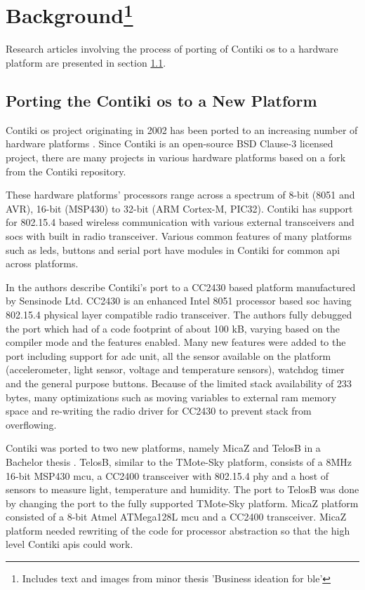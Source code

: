 \chapter[Background]{Background\footnote{Includes text and images from minor thesis 'Business ideation for \gls{ble}'}}

Research articles involving the process of porting of Contiki \gls{os} to a hardware platform are presented in section \ref{2Porting}.


\section{Porting the Contiki \gls{os} to a New Platform} \label{2Porting}
Contiki \gls{os} project originating in 2002 has been ported to an increasing number of hardware platforms \cite{contikiHw}. Since Contiki is an open-source BSD Clause-3 licensed project, there are many projects in various hardware platforms based on a fork from the Contiki repository.

These hardware platforms' processors range across a spectrum of 8-bit (8051 and AVR), 16-bit (MSP430) to 32-bit (ARM Cortex-M, PIC32). Contiki has support for 802.15.4 based wireless communication with various external transceivers and \glspl{soc} with built in radio transceiver. Various common features of many platforms such as \glspl{led}, buttons and serial port have modules in Contiki for common \gls{api} across platforms.

In \cite{Oikonomou2011} the authors describe Contiki's port to a CC2430 based platform manufactured by Sensinode Ltd. CC2430 is an enhanced Intel 8051 processor based \gls{soc} having 802.15.4 physical layer compatible radio transceiver. The authors fully debugged the port which had of a code footprint of about 100 kB, varying based on the compiler mode and the features enabled. Many new features were added to the port including support for \gls{adc} unit, all the sensor available on the platform (accelerometer, light sensor, voltage and temperature sensors), watchdog timer and the general purpose buttons. Because of the limited stack availability of 233 bytes, many optimizations such as moving variables to external \gls{ram} memory space and re-writing the radio driver for CC2430 to prevent stack from overflowing.

Contiki was ported to two new platforms, namely MicaZ and TelosB in a Bachelor thesis \cite{stan2007porting}. TelosB, similar to the TMote-Sky platform, consists of a 8MHz 16-bit MSP430 \gls{mcu}, a CC2400 transceiver with 802.15.4 \gls{phy} and a host of sensors to measure light, temperature and humidity. The port to TelosB was done by changing the port to the fully supported TMote-Sky platform. MicaZ platform consisted of a 8-bit Atmel ATMega128L \gls{mcu} and a CC2400 transceiver. MicaZ platform needed rewriting of the code for processor abstraction so that the high level Contiki \glspl{api} could work.


